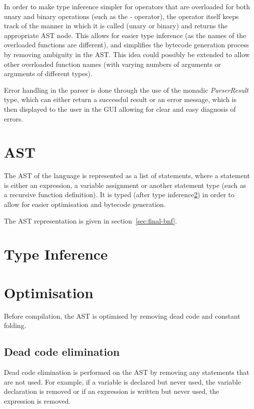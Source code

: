 In order to make type inference simpler for operators that are overloaded for both unary and binary operations (such 
as the \textit{-} operator), the operator itself keeps track of the manner in which it is called (unary or binary) and
returns the appropriate AST node. 
This allows for easier type inference (as the names of the overloaded functions are different), 
and simplifies the bytecode generation process by removing ambiguity in the AST\@.
This idea could possibly be extended to allow other overloaded function names (with varying numbers of arguments or 
arguments of different types).

Error handling in the parser is done through the use of the monadic \textit{ParserResult} type, which can either 
return a successful result or an error message, which is then displayed to the user in the GUI allowing for clear 
and easy diagnosis of errors.

\section{AST}\label{sec:expression}

The AST of the language is represented as a list of statements, where a statement is either an expression, a
variable assignment or another statement type (such as a recursive function definition).
It is typed (after type inference\ref{sec:type-inference}) in order to allow for easier optimisation and
bytecode generation.

The AST representation is given in section~\ref{sec:final-bnf}.

\section{Type Inference}\label{sec:type-inference}


\section{Optimisation}\label{sec:optimisation}

Before compilation, the AST is optimised by removing dead code and constant folding.

\subsection{Dead code elimination}\label{subsec:dead-code-elimination}

Dead code elimination is performed on the AST by removing any statements that are not used.
For example, if a variable is declared but never used, the variable declaration is removed or if an expression is
written but never used, the expression is removed.

